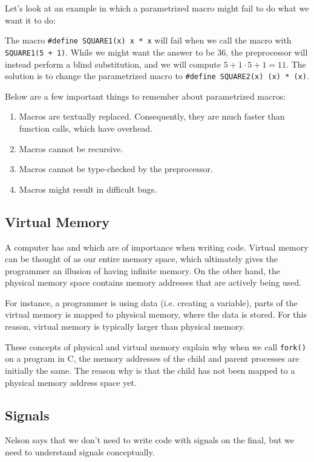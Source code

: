 Let's look at an example in which a parametrized macro might fail to do what we want it to do:

The macro \verb!#define SQUARE1(x) x * x! will fail when we call the macro with \verb!SQUARE1(5 + 1)!. While we might want the answer to be $36$, the preprocessor will instead perform a blind substitution, and we will compute $5 + 1 \cdot 5 + 1 = 11$. The solution is to change the parametrized macro to \verb!#define SQUARE2(x) (x) * (x)!.


Below are a few important things to remember about parametrized macros: \begin{enumerate}
    \item Macros are textually replaced. Consequently, they are much faster than function calls, which have overhead.
    \item Macros cannot be recursive.
    \item Macros cannot be type-checked by the preprocessor.
    \item Macros might result in difficult bugs.
\end{enumerate}


\subsection{Virtual Memory}

A computer has  and  which are of importance when writing code. Virtual memory can be thought of as our entire memory space, which ultimately gives the programmer an illusion of having infinite memory. On the other hand, the physical memory space contains memory addresses that are actively being used.

For instance, a programmer is using data (i.e. creating a variable), parts of the virtual memory is mapped to physical memory, where the data is stored. For this reason, virtual memory is typically larger than physical memory.

These concepts of physical and virtual memory explain why when we call \verb!fork()! on a program in C, the memory addresses of the child and parent processes are initially the same. The reason why is that the child has not been mapped to a physical memory address space yet. 

\subsection{Signals}

Nelson says that we don't need to write code with signals on the final, but we need to understand signals conceptually.


